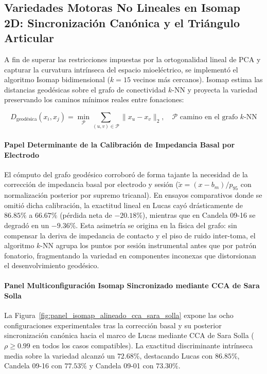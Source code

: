 \documentclass[11pt,a4paper,openany]{book}
\theoremstyle{definition}
\begin{document}
\subsection{Variedades Motoras No Lineales en Isomap 2D: Sincronización Canónica y el Triángulo Articular}
\label{subsec:isomap_variedades_no_lineales}

A fin de superar las restricciones impuestas por la ortogonalidad lineal de PCA y capturar la curvatura intrínseca del espacio mioeléctrico, se implementó el algoritmo Isomap bidimensional ($k=15$ vecinos más cercanos). Isomap estima las distancias geodésicas sobre el grafo de conectividad $k$-NN y proyecta la variedad preservando los caminos mínimos reales entre fonaciones:

\begin{equation}
    D_{\text{geodésica}}(x_i, x_j) = \min_{\mathcal{P}} \sum_{(u, v) \in \mathcal{P}} \|x_u - x_v\|_2, \quad \mathcal{P} \text{ camino en el grafo } k\text{-NN}
\end{equation}

\paragraph{Papel Determinante de la Calibración de Impedancia Basal por Electrodo}
El cómputo del grafo geodésico corroboró de forma tajante la necesidad de la corrección de impedancia basal por electrodo y sesión ($\tilde{x} = (x - b_m) / p_{95}$ con normalización posterior por supremo tricanal). En ensayos comparativos donde se omitió dicha calibración, la exactitud lineal en Lucas cayó drásticamente de $86.85\%$ a $66.67\%$ (pérdida neta de $-20.18\%$), mientras que en Candela 09-16 se degradó en un $-9.36\%$. Esta asimetría se origina en la física del grafo: sin compensar la deriva de impedancia de contacto y el piso de ruido inter-toma, el algoritmo $k$-NN agrupa los puntos por sesión instrumental antes que por patrón fonatorio, fragmentando la variedad en componentes inconexas que distorsionan el desenvolvimiento geodésico.

\paragraph{Panel Multiconfiguración Isomap Sincronizado mediante CCA de Sara Solla}
La Figura~\ref{fig:panel_isomap_alineado_cca_sara_solla} expone las ocho configuraciones experimentales tras la corrección basal y su posterior sincronización canónica hacia el marco de Lucas mediante CCA de Sara Solla ($\rho \ge 0.99$ en todos los casos compatibles). La exactitud discriminante intrínseca media sobre la variedad alcanzó un $72.68\%$, destacando Lucas con $86.85\%$, Candela 09-16 con $77.53\%$ y Candela 09-01 con $73.30\%$.
\end{document}
